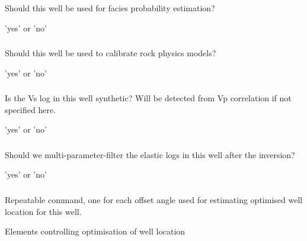 \subsubsection{}
 \slist
   \item \Description Should this well be used for facies probability estimation?
   \item \Argument 'yes' or 'no'
   \item \Default
 \elist

\subsubsection{}
 \slist
   \item \Description Should this well be used to calibrate rock physics models?
   \item \Argument 'yes' or 'no'
   \item \Default
 \elist

\subsubsection{}
 \slist
   \item \Description Is the Vs log in this well synthetic? Will be detected from Vp correlation if not specified here.
   \item \Argument 'yes' or 'no'
   \item \Default
 \elist

\subsubsection{}
 \slist
   \item \Description Should we multi-parameter-filter the elastic
                      logs in this well after the inversion?
   \item \Argument 'yes' or 'no'
   \item \Default
 \elist

\subsubsection{}
 \slist
   \item \Description Repeatable command, one for each offset angle used for estimating optimised well location for this well.
   \item \Argument Elements controlling optimisation of well location
   \item \Default
 \elist

